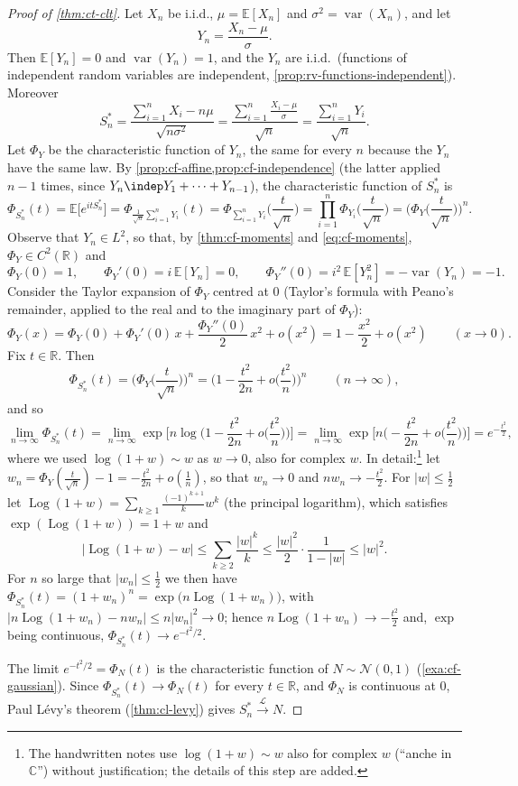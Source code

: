 \begin{proof}[Proof of \cref{thm:ct-clt}]
Let $X_n$ be i.i.d., $\mu=\mathbb E[X_n]$ and $\sigma^2=\operatorname{var}(X_n)$, and let
\[
  Y_n=\frac{X_n-\mu}\sigma .
\]
Then $\mathbb E[Y_n]=0$ and $\operatorname{var}(Y_n)=1$, and the $Y_n$ are i.i.d.\ (functions of
independent random variables are independent, \cref{prop:rv-functions-independent}). Moreover
\[
  S_n^*=\frac{\sum_{i=1}^nX_i-n\mu}{\sqrt{n\sigma^2}}=\frac{\sum_{i=1}^n\frac{X_i-\mu}\sigma}{\sqrt n}
  =\frac{\sum_{i=1}^nY_i}{\sqrt n} .
\]
Let $\Phi_Y$ be the characteristic function of $Y_n$, the same for every $n$ because the $Y_n$
have the same law. By \cref{prop:cf-affine,prop:cf-independence} (the latter applied $n-1$ times,
since $Y_n\indep Y_1+\dots+Y_{n-1}$), the characteristic function of $S_n^*$ is
\[
  \Phi_{S_n^*}(t)=\mathbb E\big[e^{itS_n^*}\big]=\Phi_{\frac1{\sqrt n}\sum_{i=1}^nY_i}(t)
  =\Phi_{\sum_{i=1}^nY_i}\Big(\frac t{\sqrt n}\Big)
  =\prod_{i=1}^n\Phi_{Y_i}\Big(\frac t{\sqrt n}\Big)=\Big(\Phi_Y\Big(\frac t{\sqrt n}\Big)\Big)^n .
\]
Observe that $Y_n\in L^2$, so that, by \cref{thm:cf-moments} and \eqref{eq:cf-moments},
$\Phi_Y\in C^2(\mathbb R)$ and
\[
  \Phi_Y(0)=1,\qquad\Phi_Y'(0)=i\,\mathbb E[Y_n]=0,\qquad
  \Phi_Y''(0)=i^2\,\mathbb E[Y_n^2]=-\operatorname{var}(Y_n)=-1 .
\]
Consider the Taylor expansion of $\Phi_Y$ centred at $0$ (Taylor's formula with Peano's
remainder, applied to the real and to the imaginary part of $\Phi_Y$):
\[
  \Phi_Y(x)=\Phi_Y(0)+\Phi_Y'(0)\,x+\frac{\Phi_Y''(0)}2\,x^2+o(x^2)=1-\frac{x^2}2+o(x^2)
  \qquad(x\to0).
\]
Fix $t\in\mathbb R$. Then
\[
  \Phi_{S_n^*}(t)=\Big(\Phi_Y\Big(\frac t{\sqrt n}\Big)\Big)^n
  =\Big(1-\frac{t^2}{2n}+o\Big(\frac{t^2}n\Big)\Big)^n\qquad(n\to\infty),
\]
and so
\[
  \lim_{n\to\infty}\Phi_{S_n^*}(t)
  =\lim_{n\to\infty}\exp\Big[n\log\Big(1-\frac{t^2}{2n}+o\Big(\frac{t^2}n\Big)\Big)\Big]
  =\lim_{n\to\infty}\exp\Big[n\Big(-\frac{t^2}{2n}+o\Big(\frac{t^2}n\Big)\Big)\Big]=e^{-\frac{t^2}2},
\]
where we used $\log(1+w)\sim w$ as $w\to0$, also for complex $w$. In detail:\footnote{The
handwritten notes use $\log(1+w)\sim w$ also for complex $w$ (``anche in $\mathbb C$'') without
justification; the details of this step
are added.} let $w_n=\Phi_Y(\frac t{\sqrt n})-1=-\frac{t^2}{2n}+o(\frac1n)$, so that $w_n\to0$ and
$nw_n\to-\frac{t^2}2$. For $|w|\le\frac12$ let
$\operatorname{Log}(1+w)=\sum_{k\ge1}\frac{(-1)^{k+1}}kw^k$ (the principal logarithm), which
satisfies $\exp(\operatorname{Log}(1+w))=1+w$ and
\[
  \big|\operatorname{Log}(1+w)-w\big|\le\sum_{k\ge2}\frac{|w|^k}k\le\frac{|w|^2}2\cdot\frac1{1-|w|}\le|w|^2 .
\]
For $n$ so large that $|w_n|\le\frac12$ we then have
$\Phi_{S_n^*}(t)=(1+w_n)^n=\exp\big(n\operatorname{Log}(1+w_n)\big)$, with
$\big|n\operatorname{Log}(1+w_n)-nw_n\big|\le n|w_n|^2\to0$; hence
$n\operatorname{Log}(1+w_n)\to-\frac{t^2}2$ and, $\exp$ being continuous,
$\Phi_{S_n^*}(t)\to e^{-t^2/2}$.

The limit $e^{-t^2/2}=\Phi_N(t)$ is the characteristic function of $N\sim\mathcal N(0,1)$
(\cref{exa:cf-gaussian}). Since $\Phi_{S_n^*}(t)\to\Phi_N(t)$ for every $t\in\mathbb R$, and
$\Phi_N$ is continuous at $0$, Paul Lévy's theorem (\cref{thm:cl-levy}) gives
$S_n^*\xrightarrow{\mathcal L}N$.
\end{proof}


